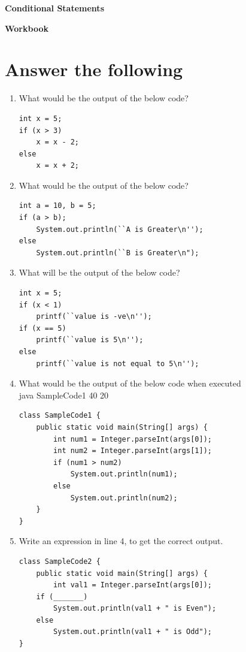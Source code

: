 \documentclass[11pt,a4paper]{article}
\def\AnswerBox{\fbox{\begin{minipage}{4in}\hfill\vspace{0.5in}\end{minipage}}}
\begin{document}
\centerline{\huge{ \textbf{Conditional Statements}}}
\vspace{1pc}
\centerline{\Large{ \textbf{Workbook}}}
\section*{Answer the following}
\begin{enumerate}
\item What would be the output of the below code?
\begin{lstlisting}
int x = 5;
if (x > 3)
    x = x - 2;
else
    x = x + 2;
\end{lstlisting}
\AnswerBox
\item What would be the output of the below code?
\begin{lstlisting}
int a = 10, b = 5;
if (a > b);
    System.out.println(``A is Greater\n'');
else
    System.out.println(``B is Greater\n");
\end{lstlisting}
\AnswerBox

\item What will be the output of the below code?
\begin{lstlisting}
int x = 5;
if (x < 1)
    printf(``value is -ve\n'');
if (x == 5)
    printf(``value is 5\n'');
else
    printf(``value is not equal to 5\n'');
\end{lstlisting}

\AnswerBox

\item What would be the output of the below code when executed\\
    java SampleCode1 40 20
\begin{lstlisting} 
class SampleCode1 {
    public static void main(String[] args) {
        int num1 = Integer.parseInt(args[0]);
        int num2 = Integer.parseInt(args[1]);
        if (num1 > num2)
            System.out.println(num1);
        else
            System.out.println(num2);
    }
}
\end{lstlisting} 
\AnswerBox

\item Write an expression in line 4, to get the correct output.
\begin{lstlisting} 
class SampleCode2 {
    public static void main(String[] args) {
        int val1 = Integer.parseInt(args[0]);
    if (_______)
        System.out.println(val1 + " is Even");
    else
        System.out.println(val1 + " is Odd");
}
\end{lstlisting} 
\AnswerBox


\end{enumerate}
\end{document}
